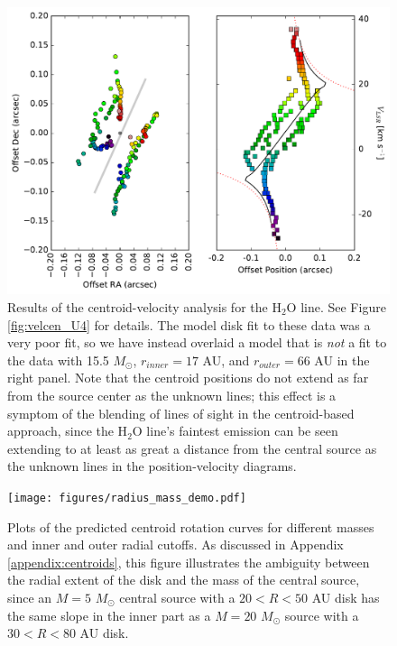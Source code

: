 \documentclass[twocolumn]{aastex61}
\newcommand{\msun}{\ensuremath{M_{\odot}}\xspace}			%
\newcommand{\water}{H$_{2}$O\xspace}		%
\begin{document}
\begin{figure}[!htp]
\includegraphics[scale=1,width=6in]{figures/H2Ov2=1_5(5,0)-6(4,3)_pp_pv_plots.pdf}
\caption{Results of the centroid-velocity analysis for the \water line.
See Figure \ref{fig:velcen_U4} for details.
The model disk fit to these data was a very poor fit, so we
have instead overlaid a model that is \emph{not} a fit to the data
with 15.5 \msun, $r_{inner}=17$ AU, and $r_{outer}=66$ AU in the
right panel.
Note that the centroid positions do not extend as far from
the source center as the unknown lines; this effect is 
a symptom of the blending of lines of sight in the centroid-based approach,
since the \water line's faintest emission can be seen extending to at least as
great a distance from the central source as the unknown lines in the
position-velocity diagrams.
}
\label{fig:velcen_h2o}
\end{figure}



\begin{figure}[!htp]
\texttt{[image: figures/radius\_mass\_demo.pdf]}
\caption{Plots of the predicted centroid rotation curves for different masses
and inner and outer radial cutoffs.  As discussed in Appendix \ref{appendix:centroids},
this figure illustrates the ambiguity between the radial extent of the disk and
the mass of the central source, since an $M=5$ \msun central source with a
$20<R<50$ AU disk has the same slope in the inner part as a $M=20$ \msun source
with a $30<R<80$ AU disk.
}
\label{fig:massradiusdemo}
\end{figure}


\end{document}
